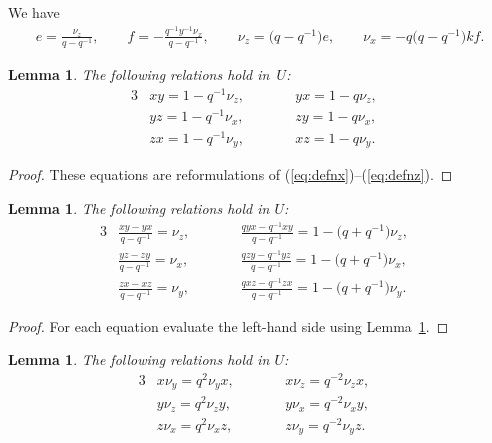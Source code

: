 \documentclass[pdftex]{sigma}
\numberwithin{equation}{section}
\newtheorem{Lemma}[Theorem]{Lemma}
\begin{document}
\begin{Note}
\label{note:efview}
We have
\begin{gather*}
 e =\frac{\nu_z}{q-q^{-1}},
\qquad
f =-\frac{q^{-1} y^{-1}\nu_x}{q-q^{-1}},
\qquad
 \nu_z = \big(q-q^{-1}\big)e, \qquad
\nu_x = -q\big(q-q^{-1}\big)kf.
\end{gather*}
\end{Note}




\begin{Lemma}
\label{lem:prod}
The following relations hold in~$U$:
\begin{alignat}{3}
& xy =1-q^{-1}\nu_z, \qquad && yx = 1-q\nu_z,&
\label{eq:xyx}
\\
& yz =1-q^{-1}\nu_x, \qquad &&  zy = 1-q\nu_x,&
\label{eq:yzy}
\\
& zx =1-q^{-1}\nu_y, \qquad && xz = 1-q\nu_y.&
\label{eq:zxz}
\end{alignat}
\end{Lemma}

\begin{proof}
These equations are
reformulations of
(\ref{eq:defnx})--(\ref{eq:defnz}).
\end{proof}


\begin{Lemma}
The following relations hold in
$U$:
\begin{alignat}{3}
& \frac{xy-yx}{q-q^{-1}}=
\nu_z, \qquad &&
\frac{qyx-q^{-1}xy}{q-q^{-1}}= 1-\big(q+q^{-1}\big)\nu_z,&
\label{eq:double1}
\\
& \frac{yz-zy}{q-q^{-1}}=
\nu_x,\qquad&&
\frac{qzy-q^{-1}yz}{q-q^{-1}}= 1-\big(q+q^{-1}\big)\nu_x,&
\label{eq:double2}
\\
& \frac{zx-xz}{q-q^{-1}}=
\nu_y,\qquad &&
\frac{qxz-q^{-1}zx}{q-q^{-1}}= 1-\big(q+q^{-1}\big)\nu_y. &
\label{eq:double3}
\end{alignat}
\end{Lemma}

\begin{proof}
For each equation
evaluate the left-hand side using
Lemma~\ref{lem:prod}.
\end{proof}


\begin{Lemma}
\label{lem:qcom}
The following relations hold in
$U$:
\begin{alignat}{3}
& x \nu_y = q^2 \nu_y x, \qquad &&
x \nu_z = q^{-2} \nu_z x, &
\label{eq:com1}
\\
& y \nu_z = q^2 \nu_z y, \qquad &&
y \nu_x = q^{-2} \nu_x y, &
\label{eq:com2}
\\
& z \nu_x = q^2 \nu_x z, \qquad &&
z \nu_y = q^{-2} \nu_y z. &
\label{eq:com3}
\end{alignat}
\end{Lemma}
\end{document}
